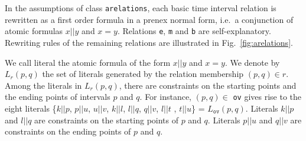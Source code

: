 \documentclass{llncs}
\begin{document}

In the assumptions of class \texttt{arelations}, each basic time interval relation is rewritten as a first order formula in a prenex normal form, i.e.~a conjunction of atomic formulas $x || y$ and $x  = y$. 
Relations \texttt{e}, \texttt{m} and \texttt{b}  are self-explanatory. Rewriting rules of the remaining relations are illustrated in Fig.~\ref{fig:arelations}. %


We call literal the atomic formula of the form $x||y$ and $x=y$. %
We denote by $L_r(p,q)$ the set of literals generated by the relation membership $(p,q) \in r$. Among the literals in $L_r(p,q)$, there are constraints on the starting points and the ending points of intervals $p$ and $q$. For instance,  $(p,q) \in$ \texttt{ov} gives rise to the eight literals \{$k||p$, $p||u$, $u||v$, $k||l$, $l||q$, $q||v$, $l||t$ , $t||u$\} = $L_{\texttt{ov}}(p,q)$. Literals $k||p$ and $l||q$ are constraints on the starting points of $p$ and $q$. Literals $p||u$ and $q||v$ are constraints on the ending points of $p$ and $q$.  


%
\end{document}

